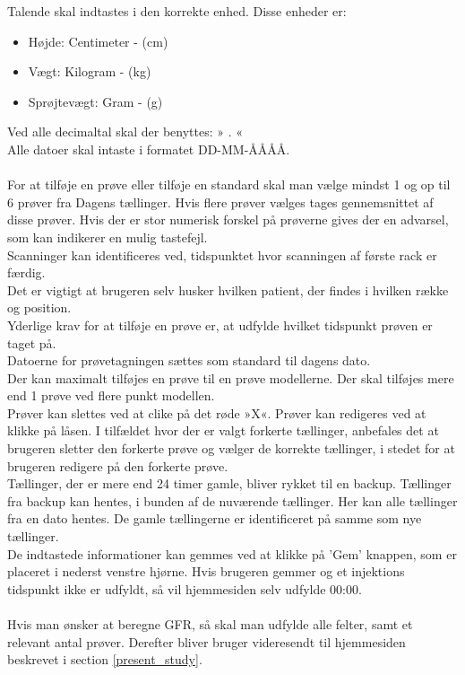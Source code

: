 \documentclass{article}
\begin{document}
Talende skal indtastes i den korrekte enhed. Disse enheder er:
\begin{itemize}
	\item Højde: Centimeter - (cm)
	\item Vægt: Kilogram - (kg)
	\item Sprøjtevægt: Gram - (g)
\end{itemize}
Ved alle decimaltal skal der benyttes: » . «\\%
Alle datoer skal intaste i formatet DD-MM-ÅÅÅÅ.\\\\
For at tilføje en prøve eller tilføje en standard skal man vælge mindst 1 og op til 6 prøver fra Dagens tællinger. Hvis flere prøver vælges tages gennemsnittet af disse prøver. Hvis der er stor numerisk forskel på prøverne gives der en advarsel, som kan indikerer en mulig tastefejl.\\
Scanninger kan identificeres ved, tidspunktet hvor scanningen af første rack er færdig.\\

Det er vigtigt at brugeren selv husker hvilken patient, der findes i hvilken række og position.\\

Yderlige krav for at tilføje en prøve er, at udfylde hvilket tidspunkt prøven er taget på.\\ Datoerne for prøvetagningen sættes som standard til dagens dato.\\
Der kan maximalt tilføjes en prøve til en prøve modellerne. Der skal tilføjes mere end 1 prøve ved flere punkt modellen.\\

Prøver kan slettes ved at clike på det røde »X«. Prøver kan redigeres ved at klikke på låsen. I tilfældet hvor der er valgt forkerte tællinger, anbefales det at brugeren sletter den forkerte prøve og vælger de korrekte tællinger, i stedet for at brugeren redigere på den forkerte prøve.\\

Tællinger, der er mere end 24 timer gamle, bliver rykket til en backup. Tællinger fra backup kan hentes, i bunden af de nuværende tællinger. Her kan alle tællinger fra en dato hentes. De gamle tællingerne er identificeret på samme som nye tællinger.
\\

De indtastede informationer kan gemmes ved at klikke på 'Gem' knappen, som er placeret i nederst venstre hjørne. Hvis brugeren gemmer og et injektions tidspunkt ikke er udfyldt, så vil hjemmesiden selv udfylde 00:00.\\\\
Hvis man ønsker at beregne GFR, så skal man udfylde alle felter, samt et relevant antal prøver. Derefter bliver bruger videresendt til hjemmesiden beskrevet i section \ref{present_study}.\\
\end{document}
